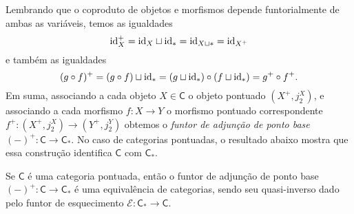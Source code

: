 Lembrando que o coproduto de objetos e morfismos depende funtorialmente de ambas as variáveis, temos as igualdades
\begin{displaymath}
  \mathrm{id}_{X}^{+} = \mathrm{id}_{X} \sqcup \mathrm{id}_{*} = \mathrm{id}_{X \sqcup *} = \mathrm{id}_{X^{+}}
\end{displaymath}
e também as igualdades
\begin{displaymath}
  (g \circ f)^{+} = (g \circ f) \sqcup \mathrm{id}_{*} = (g \sqcup \mathrm{id}_{*}) \circ (f \sqcup \mathrm{id}_{*}) = g^{+} \circ f^{+}.
\end{displaymath}
Em suma, associando a cada objeto $X \in \mathsf{C}$ o objeto pontuado $(X^{+},j^{X}_{2})$, e associando a cada morfismo $f: X \to Y$ o morfismo pontuado correspondente $f^{+}: (X^{+},j^{X}_{2}) \to (Y^{+},j^{Y}_{2})$ obtemos o \emph{funtor de adjunção de ponto base} $(-)^{+}: \mathsf{C} \to \mathsf{C}_{*}$.
No caso de categorias pontuadas, o resultado abaixo mostra que essa construção identifica $\mathsf{C}$ com $\mathsf{C}_{*}$.

\begin{prop}\label{prop:cat_pontuada_implica_adjuntar_ponto_base_eh_equiv}
  Se $\mathsf{C}$ é uma categoria pontuada, então o funtor de adjunção de ponto base $(-)^{+}: \mathsf{C} \to \mathsf{C}_{*}$ é uma equivalência de categorias, sendo seu quasi-inverso dado pelo funtor de esquecimento $\mathcal{E}: \mathsf{C}_{*} \to \mathsf{C}$.
\end{prop}

